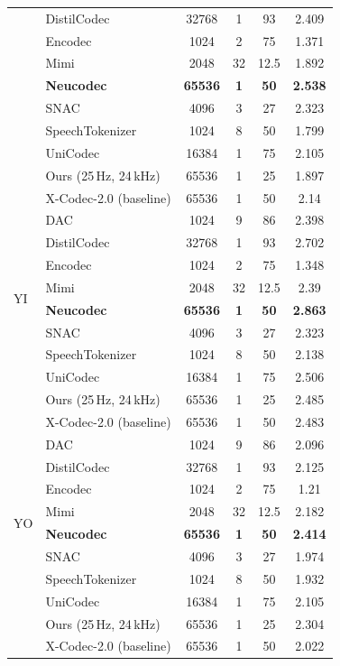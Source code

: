 \documentclass[preprint]{article}
\begin{document}
\begin{longtable}{llcccc}
  & DistilCodec & 32768 & 1 & 93 & 2.409 \\
  & Encodec & 1024 & 2 & 75 & 1.371 \\
  & Mimi & 2048 & 32 & 12.5 & 1.892 \\
  & \textbf{Neucodec} & \textbf{65536} & \textbf{1} & \textbf{50} & \textbf{2.538} \\
  & SNAC & 4096 & 3 & 27 & 2.323 \\
  & SpeechTokenizer & 1024 & 8 & 50 & 1.799 \\
  & UniCodec & 16384 & 1 & 75 & 2.105 \\
  & Ours (25\,Hz, 24\,kHz) & 65536 & 1 & 25 & 1.897 \\
  & X-Codec-2.0 (baseline) & 65536 & 1 & 50 & 2.14 \\
\midrule
\multirow{8}{*}{YI}
  & DAC & 1024 & 9 & 86 & 2.398 \\
  & DistilCodec & 32768 & 1 & 93 & 2.702 \\
  & Encodec & 1024 & 2 & 75 & 1.348 \\
  & Mimi & 2048 & 32 & 12.5 & 2.39 \\
  & \textbf{Neucodec} & \textbf{65536} & \textbf{1} & \textbf{50} & \textbf{2.863} \\
  & SNAC & 4096 & 3 & 27 & 2.323 \\
  & SpeechTokenizer & 1024 & 8 & 50 & 2.138 \\
  & UniCodec & 16384 & 1 & 75 & 2.506 \\
  & Ours (25\,Hz, 24\,kHz) & 65536 & 1 & 25 & 2.485 \\
  & X-Codec-2.0 (baseline) & 65536 & 1 & 50 & 2.483 \\
\midrule
\multirow{8}{*}{YO}
  & DAC & 1024 & 9 & 86 & 2.096 \\
  & DistilCodec & 32768 & 1 & 93 & 2.125 \\
  & Encodec & 1024 & 2 & 75 & 1.21 \\
  & Mimi & 2048 & 32 & 12.5 & 2.182 \\
  & \textbf{Neucodec} & \textbf{65536} & \textbf{1} & \textbf{50} & \textbf{2.414} \\
  & SNAC & 4096 & 3 & 27 & 1.974 \\
  & SpeechTokenizer & 1024 & 8 & 50 & 1.932 \\
  & UniCodec & 16384 & 1 & 75 & 2.105 \\
  & Ours (25\,Hz, 24\,kHz) & 65536 & 1 & 25 & 2.304 \\
  & X-Codec-2.0 (baseline) & 65536 & 1 & 50 & 2.022 \\

\end{longtable}
\end{document}
